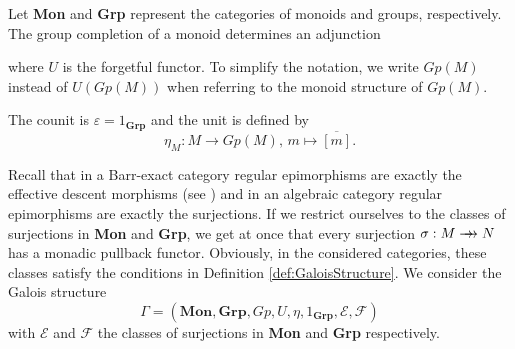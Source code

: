 \begin{definition}
    Let \textbf{Mon} and \textbf{Grp} represent the categories of monoids and groups, respectively. The group completion of a monoid determines an adjunction
    \begin{center}
    \end{center}
    where $U$ is the forgetful functor. To simplify the notation, we write $Gp(M)$ instead of $U(Gp(M))$ when referring to the monoid structure of $Gp(M)$.

    The counit is $\varepsilon = 1_{\textbf{Grp}}$ and the unit is defined by
    \[ \eta_M:M\longrightarrow Gp(M)\text{, }m\longmapsto \overline{[m]}. \]
\end{definition}

Recall that in a Barr-exact category regular epimorphisms are exactly the effective descent morphisms (see \cite{pedicchio2004categoricalVIII}) and in an algebraic category regular epimorphisms are exactly the surjections. If we restrict ourselves to the classes of surjections in \textbf{Mon} and \textbf{Grp}, we get at once that every surjection $\sigma:M\rrightarrow N$ has a monadic pullback functor. Obviously, in the considered categories, these classes satisfy the conditions in Definition \ref{def:GaloisStructure}. We consider the Galois structure
\[ \Gamma = (\textbf{Mon}, \textbf{Grp}, Gp, U, \eta, 1_{\textbf{Grp}}, \mathscr{E}, \mathscr{F}) \]
with $\mathscr{E}$ and $\mathscr{F}$ the classes of surjections in \textbf{Mon} and \textbf{Grp} respectively.

